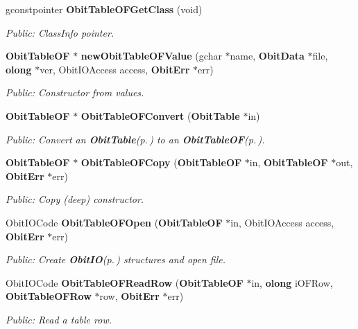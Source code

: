 \begin{CompactItemize}
gconstpointer {\bf Obit\-Table\-OFGet\-Class} (void)
\begin{CompactList}\small\item\em Public: Class\-Info pointer. \item\end{CompactList}\item 
{\bf Obit\-Table\-OF} $\ast$ {\bf new\-Obit\-Table\-OFValue} (gchar $\ast$name, {\bf Obit\-Data} $\ast$file, {\bf olong} $\ast$ver, Obit\-IOAccess access, {\bf Obit\-Err} $\ast$err)
\begin{CompactList}\small\item\em Public: Constructor from values. \item\end{CompactList}\item 
{\bf Obit\-Table\-OF} $\ast$ {\bf Obit\-Table\-OFConvert} ({\bf Obit\-Table} $\ast$in)
\begin{CompactList}\small\item\em Public: Convert an {\bf Obit\-Table}{\rm (p.\,\pageref{structObitTable})} to an {\bf Obit\-Table\-OF}{\rm (p.\,\pageref{structObitTableOF})}. \item\end{CompactList}\item 
{\bf Obit\-Table\-OF} $\ast$ {\bf Obit\-Table\-OFCopy} ({\bf Obit\-Table\-OF} $\ast$in, {\bf Obit\-Table\-OF} $\ast$out, {\bf Obit\-Err} $\ast$err)
\begin{CompactList}\small\item\em Public: Copy (deep) constructor. \item\end{CompactList}\item 
Obit\-IOCode {\bf Obit\-Table\-OFOpen} ({\bf Obit\-Table\-OF} $\ast$in, Obit\-IOAccess access, {\bf Obit\-Err} $\ast$err)
\begin{CompactList}\small\item\em Public: Create {\bf Obit\-IO}{\rm (p.\,\pageref{structObitIO})} structures and open file. \item\end{CompactList}\item 
Obit\-IOCode {\bf Obit\-Table\-OFRead\-Row} ({\bf Obit\-Table\-OF} $\ast$in, {\bf olong} i\-OFRow, {\bf Obit\-Table\-OFRow} $\ast$row, {\bf Obit\-Err} $\ast$err)
\begin{CompactList}\small\item\em Public: Read a table row. \item\end{CompactList}\item 

\end{CompactItemize}
